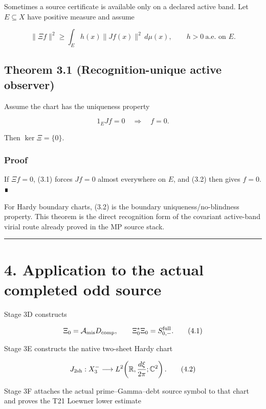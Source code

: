Sometimes a source certificate is available only on a declared active band.
Let \(E\subseteq X\) have positive measure and assume

\[
\|\Xi f\|^2
\ge
\int_E h(x)\|Jf(x)\|^2\,d\mu(x),
\qquad
h>0\ \text{a.e. on }E.
\tag{3.1}
\]

\hypertarget{theorem-3.1-recognition-unique-active-observer}{%
\subsection{Theorem 3.1 (Recognition-unique active observer)}\label{theorem-3.1-recognition-unique-active-observer}}

Assume the chart has the uniqueness property

\[
1_EJf=0
\quad\Longrightarrow\quad
f=0.
\tag{3.2}
\]

Then \(\ker\Xi=\{0\}\).

\hypertarget{proof-1}{%
\subsubsection{Proof}\label{proof-1}}

If \(\Xi f=0\), (3.1) forces \(Jf=0\) almost everywhere on \(E\), and (3.2)
then gives \(f=0\). ∎

For Hardy boundary charts, (3.2) is the boundary uniqueness/no-blindness
property. This theorem is the direct recognition form of the covariant
active-band virial route already proved in the MP source stack.

\begin{center}\rule{0.5\linewidth}{0.5pt}\end{center}

\hypertarget{application-to-the-actual-completed-odd-source}{%
\section{4. Application to the actual completed odd source}\label{application-to-the-actual-completed-odd-source}}

Stage 3D constructs

\[
\Xi_0
=\mathcal A_{\rm mis}D_{\rm comp},
\qquad
\Xi_0^*\Xi_0
=S_{0,-}^{\mathrm{full}}.
\tag{4.1}
\]

Stage 3E constructs the native two-sheet Hardy chart

\[
J_{\rm 2sh}:X_3^-\longrightarrow
L^2\!\left(\mathbb R,\frac{d\xi}{2\pi};\mathbb C^2\right).
\tag{4.2}
\]

Stage 3F attaches the actual prime--Gamma--debt source symbol to that chart and
proves the T21 Loewner lower estimate

